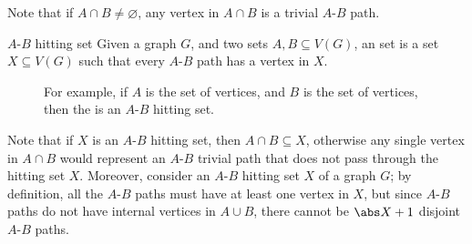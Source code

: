 \documentclass[a4paper, 12pt]{report}
\begin{document}
    Note that if $A \cap B \neq \varnothing$, any vertex in $A \cap B$ is a trivial $A$-$B$ path.

    \begin{frameddefn}{$A$-$B$ hitting set}
        Given a graph $G$, and two sets $A, B \subseteq V(G)$, an  set is a set $X \subseteq V(G)$ such that every $A$-$B$ path has a vertex in $X$.
    \end{frameddefn}

    \begin{figure}[H]
        \centering
        \caption{For example, if $A$ is the set of  vertices, and $B$ is the set of  vertices, then the  is an $A$-$B$ hitting set.}
    \end{figure}

    Note that if $X$ is an $A$-$B$ hitting set, then $A \cap B \subseteq X$, otherwise any single vertex in $A \cap B$ would represent an $A$-$B$ trivial path that does not pass through the hitting set $X$. Moreover, consider an $A$-$B$ hitting set $X$ of a graph $G$; by definition, all the $A$-$B$ paths must have at least one vertex in $X$, but since $A$-$B$ paths do not have internal vertices in $A \cup B$, there cannot be $\abs X + 1$ disjoint $A$-$B$ paths.
\end{document}
